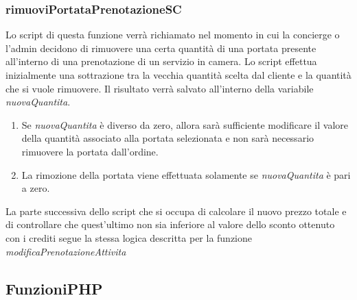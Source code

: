 \documentclass [a4paper, 12pt]{book}
\begin{document}
\subsubsection{rimuoviPortataPrenotazioneSC}
Lo script di questa funzione verrà richiamato nel momento in cui la concierge o l'admin decidono di rimuovere una certa quantità di una portata presente all'interno di una prenotazione di un servizio in camera. Lo script effettua inizialmente una sottrazione tra la vecchia quantità scelta dal cliente e la quantità che si vuole rimuovere. Il risultato verrà salvato all'interno della variabile \textit{nuovaQuantita}.
\begin{enumerate}
\item Se \textit{nuovaQuantita} è diverso da zero, allora sarà sufficiente modificare il valore della quantità associato alla portata selezionata e non sarà necessario rimuovere la portata dall'ordine.
\item La rimozione della portata viene effettuata solamente se \textit{nuovaQuantita} è pari a zero.
\end{enumerate}
La parte successiva dello script che si occupa di calcolare il nuovo prezzo totale e di controllare che quest'ultimo non sia inferiore al valore dello sconto ottenuto con i crediti segue la stessa logica descritta per la funzione \textit{modificaPrenotazioneAttivita}

\subsection{FunzioniPHP}
\end{document}
